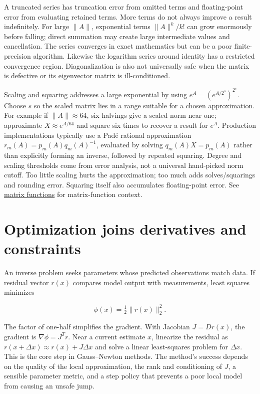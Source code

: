 A truncated series has truncation error from omitted terms and floating-point error from evaluating retained terms. More terms do not always improve a result indefinitely. For large \(\|A\|\), exponential terms \(\|A\|^k/k!\) can grow enormously before falling; direct summation may create large intermediate values and cancellation. The series converges in exact mathematics but can be a poor finite-precision algorithm. Likewise the logarithm series around identity has a restricted convergence region. Diagonalization is also not universally safe when the matrix is defective or its eigenvector matrix is ill-conditioned.

Scaling and squaring addresses a large exponential by using \(e^A=(e^{A/2^s})^{2^s}\). Choose \(s\) so the scaled matrix lies in a range suitable for a chosen approximation. For example if \(\|A\|\approx64\), six halvings give a scaled norm near one; approximate \(X\approx e^{A/64}\) and square six times to recover a result for \(e^A\). Production implementations typically use a Padé rational approximation \(r_m(A)=p_m(A)q_m(A)^{-1}\), evaluated by solving \(q_m(A)X=p_m(A)\) rather than explicitly forming an inverse, followed by repeated squaring. Degree and scaling thresholds come from error analysis, not a universal hand-picked norm cutoff. Too little scaling hurts the approximation; too much adds solves/squarings and rounding error. Squaring itself also accumulates floating-point error. See \hyperref[02-foundations-ii-ch026-matrix-functions-turn-repeated-linear-actions-into-one-operator]{matrix functions} for matrix-function context.

\section{Optimization joins derivatives and constraints}\label{02-foundations-ii-ch026-optimization-joins-derivatives-and-constraints}

\hypertarget{02-foundations-ii-ch026-optimization-joins-derivatives-and-constraints}{}

An inverse problem seeks parameters whose predicted observations match data. If residual vector \(r(x)\) compares model output with measurements, least squares minimizes

\[
\phi(x)=\tfrac12\|r(x)\|_2^2.
\]

The factor of one-half simplifies the gradient. With Jacobian \(J=Dr(x)\), the gradient is \(\nabla\phi=J^Tr\). Near a current estimate \(x\), linearize the residual as \(r(x+\Delta x)\approx r(x)+J\Delta x\) and solve a linear least-squares problem for \(\Delta x\). This is the core step in Gauss--Newton methods. The method's success depends on the quality of the local approximation, the rank and conditioning of \(J\), a sensible parameter metric, and a step policy that prevents a poor local model from causing an unsafe jump.

